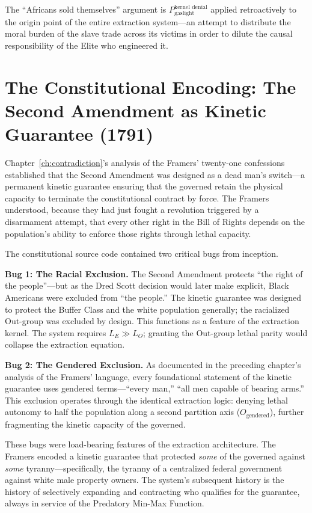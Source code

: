 The ``Africans sold themselves'' argument is $P_{\text{gaslight}}^{\text{kernel denial}}$ applied retroactively to the origin point of the entire extraction system---an attempt to distribute the moral burden of the slave trade across its victims in order to dilute the causal responsibility of the Elite who engineered it.

\section{The Constitutional Encoding: The Second Amendment as Kinetic Guarantee (1791)}

Chapter~\ref{ch:contradiction}'s analysis of the Framers' twenty-one confessions established that the Second Amendment was designed as a dead man's switch---a permanent kinetic guarantee ensuring that the governed retain the physical capacity to terminate the constitutional contract by force. The Framers understood, because they had just fought a revolution triggered by a disarmament attempt, that every other right in the Bill of Rights depends on the population's ability to enforce those rights through lethal capacity.

The constitutional source code contained two critical bugs from inception.

\textbf{Bug 1: The Racial Exclusion.} The Second Amendment protects ``the right of the people''---but as the Dred Scott decision would later make explicit, Black Americans were excluded from ``the people.'' The kinetic guarantee was designed to protect the Buffer Class and the white population generally; the racialized Out-group was excluded by design. This functions as a feature of the extraction kernel. The system requires $L_E \gg L_O$; granting the Out-group lethal parity would collapse the extraction equation.

\textbf{Bug 2: The Gendered Exclusion.} As documented in the preceding chapter's analysis of the Framers' language, every foundational statement of the kinetic guarantee uses gendered terms---``every man,'' ``all men capable of bearing arms.'' This exclusion operates through the identical extraction logic: denying lethal autonomy to half the population along a second partition axis ($O_{\text{gendered}}$), further fragmenting the kinetic capacity of the governed.

These bugs were load-bearing features of the extraction architecture. The Framers encoded a kinetic guarantee that protected \textit{some} of the governed against \textit{some} tyranny---specifically, the tyranny of a centralized federal government against white male property owners. The system's subsequent history is the history of selectively expanding and contracting who qualifies for the guarantee, always in service of the Predatory Min-Max Function.

